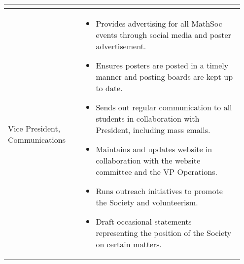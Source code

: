 \begin{longtable}{p{0.3\linewidth} p{0.65\linewidth}}
\begin{itemize}
\end{itemize}
\\
\midrule
Vice President, Communications &
\begin{itemize}
\item Provides advertising for all MathSoc events through social media and poster advertisement.
\item Ensures posters are posted in a timely manner and posting boards are kept up to date.
\item Sends out regular communication to all students in collaboration with President, including mass emails.
\item Maintains and updates website in collaboration with the website committee and the VP Operations.
\item Runs outreach initiatives to promote the Society and volunteerism.
\item Draft occasional statements representing the position of the Society on certain matters.
\end{itemize}
\\
\bottomrule
\end{longtable}
